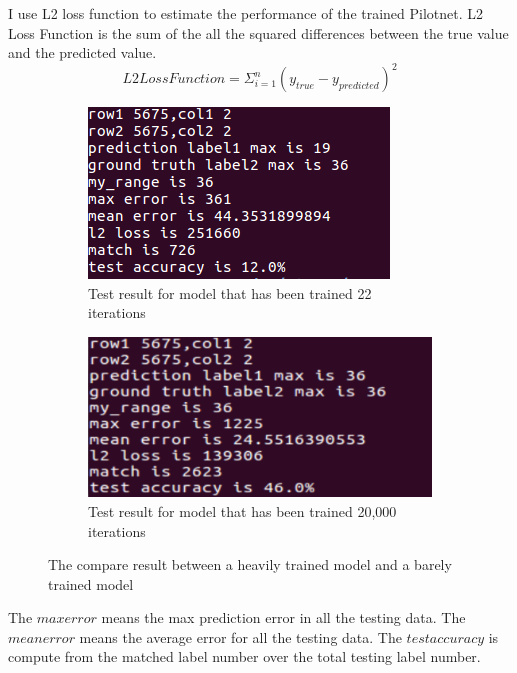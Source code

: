 \documentclass[conference]{IEEEtran}
\begin{document}
I use L2 loss function to estimate the performance of the trained Pilotnet. L2 Loss Function is the sum of the all the squared differences between the true value and the predicted value.
\[L2LossFunction = \Sigma_{i = 1}^{n}(y_{true}-y_{predicted})^2   \]

\begin{figure}[ht]
	\centering
	\begin{subfigure}[b]{0.21\textwidth}
		\includegraphics[width=\textwidth]{fig9.png}
		\caption{Test result for model that has been trained 22 iterations}
		\label{fig:acc1}
	\end{subfigure}
	\begin{subfigure}[b]{0.25\textwidth}
		\includegraphics[width=\textwidth]{fig8.png}
		\caption{Test result for model that has been trained 20,000 iterations}
		\label{fig:acc2}
	\end{subfigure}
	\caption{The compare result between a heavily trained model and a barely trained model}
	\label{fig:tworesult}
\end{figure}

The $max error$ means the max prediction error in all the testing data. The $mean error$ means the average error for all the testing data. The $test accuracy$ is compute from the matched label number over the total testing label number.
\end{document}

